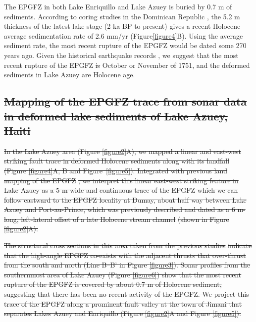 \documentclass[linenumbers,draft]{agujournal}
\providecommand{\DIFadd}[1]{{\protect\color{blue}\uwave{#1}}} %
\providecommand{\DIFdel}[1]{{\protect\color{red}\sout{#1}}}                      %
\providecommand{\DIFaddbegin}{} %
\providecommand{\DIFaddend}{} %
\providecommand{\DIFdelbegin}{} %
\providecommand{\DIFdelend}{} %
\begin{document}
The EPGFZ in both Lake Enriquillo and Lake Azuey is buried by 0.7 m of sediments. According to coring studies in the Dominican Republic \citep{taylor1985stratigraphy,rios2013holocene}, the 5.2 m thickness of the latest lake stage (2 ka BP to present) gives a recent Holocene average sedimentation rate of 2.6 mm/yr (Figure\DIFaddbegin \DIFadd{~}\DIFaddend \ref{figure4}B). Using the average sediment rate, the most recent rupture of the EPGFZ would be dated \DIFaddbegin \DIFadd{to }\DIFaddend some 270 years ago. Given the historical earthquake records \citep{bakun2012significant}, we suggest that the most recent rupture of the EPGFZ \DIFdelbegin \DIFdel{is }\DIFdelend \DIFaddbegin \DIFadd{corresponds to the historical events of }\DIFaddend October or November \DIFdelbegin \DIFdel{of }\DIFdelend 1751, and the deformed sediments in Lake Azuey are \DIFaddbegin \DIFadd{of }\DIFaddend Holocene age.

\DIFdelbegin \subsection{\DIFdel{Mapping of the EPGFZ trace from sonar data in deformed lake sediments of Lake Azuey, Haiti}}
\addtocounter{subsection}{-1}%
\DIFdel{In the Lake Azuey area (Figure \ref{figure2}A), we mapped a linear and east-west striking fault trace in deformed Holocene sediments along with its landfall (Figure \ref{figure4}A, B and Figure~\ref{figure5}). Integrated with previous land mapping of the EPGFZ }%
\DIFdel{, we interpret this linear east-west striking feature in Lake Azuey as a 5 m-wide and continuous trace of the EPGFZ which we can follow eastward to the EPGFZ locality at Dumay, about half way between Lake Azuey and Port-au-Prince, which was previously described and dated as a 6 m-long, left-lateral offset of a late Holocene stream channel }%
\DIFdel{(shown in Figure \ref{figure2}A). 
}%

\DIFdel{The structural cross sections in this area taken from the previous studies }%
\DIFdel{indicate that the high-angle EPGFZ co-exists with the adjacent thrusts that over-thrust from the south and north (Line B--B' in Figure \ref{figure3}). Sonar profiles from the southernmost area of Lake Azuey (Figure \ref{figure6}) show that the most recent rupture of the EPGFZ is covered by about 0.7 m of Holocene sediment, suggesting that there has been no recent activity of the EPGFZ. We project this trace of the EPGFZ along a prominent fault valley at the town of Jimani that separates Lakes Azuey and Enriquillo (Figure \ref{figure2}A and Figure \ref{figure5}).
}%
\end{document}
